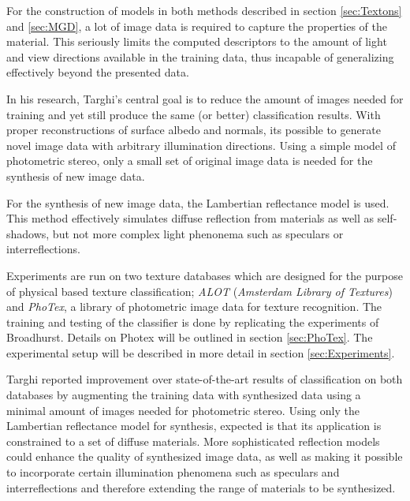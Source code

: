 For the construction of models in both methods described in section \ref{sec:Textons} and \ref{sec:MGD}, a lot of image data is required to capture the properties of the material. This seriously limits the computed descriptors to the amount of light and view directions available in the training data, thus incapable of generalizing effectively beyond the presented data.

In his research, Targhi's central goal is to reduce the amount of images needed for training and yet still produce the same (or better) classification results. With proper reconstructions of surface albedo and normals, its possible to generate novel image data with arbitrary illumination directions. Using a simple model of photometric stereo, only a small set of original image data is needed for the synthesis of new image data.

For the synthesis of new image data, the Lambertian reflectance model is used. This method effectively simulates diffuse reflection from materials as well as self-shadows, but not more complex light phenonema such as speculars or interreflections. 

Experiments are run on two texture databases which are designed for the purpose of physical based texture classification; \textit{ALOT} (\textit{Amsterdam Library of Textures}) and \textit{PhoTex}, a library of photometric image data for texture recognition. The training and testing of the classifier is done by replicating the experiments of Broadhurst. Details on Photex will be outlined in section \ref{sec:PhoTex}. The experimental setup will be described in more detail in section \ref{sec:Experiments}.

Targhi reported improvement over state-of-the-art results of classification on both databases by augmenting the training data with synthesized data using a minimal amount of images needed for photometric stereo. Using only the Lambertian reflectance model for synthesis, expected is that its application is constrained to a set of diffuse materials. More sophisticated reflection models could enhance the quality of synthesized image data, as well as making it possible to incorporate certain illumination phenomena such as speculars and interreflections and therefore extending the range of materials to be synthesized.

